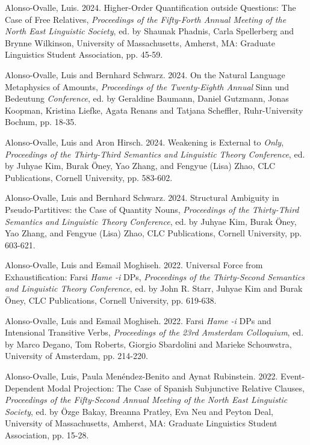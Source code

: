 \documentclass[11pt]{article}
\begin{document}
Alonso-Ovalle, Luis. 2024. Higher-Order Quantification outside Questions: The Case of Free Relatives, \textit{Proceedings of the Fifty-Forth Annual Meeting of the North East Linguistic Society}, ed. by Shaunak Phadnis, Carla Spellerberg and Brynne Wilkinson, University of Massachusetts, Amherst, MA: Graduate Linguistics Student Association, pp. 45-59.

Alonso-Ovalle, Luis and Bernhard Schwarz. 2024. On the Natural Language Metaphysics of Amounts, \textit{Proceedings of the Twenty-Eighth Annual} Sinn und Bedeutung \textit{Conference}, ed. by Geraldine Baumann, Daniel Gutzmann, Jonas Koopman, Kristina Liefke, Agata Renans and Tatjana Scheffler, Ruhr-University Bochum, pp. 18-35.


Alonso-Ovalle, Luis and Aron Hirsch. 2024. Weakening is External to \textit{Only}, \textit{Proceedings of the Thirty-Third Semantics and Linguistic Theory Conference}, ed. by Juhyae Kim, Burak \"{O}ney, Yao Zhang, and Fengyue (Lisa) Zhao, CLC Publications, Cornell University, pp. 583-602.

Alonso-Ovalle, Luis and Bernhard Schwarz. 2024. Structural Ambiguity in Pseudo-Partitives: the Case of Quantity Nouns, \textit{Proceedings of the Thirty-Third Semantics and Linguistic Theory Conference}, ed. by Juhyae Kim, Burak \"{O}ney, Yao Zhang, and Fengyue (Lisa) Zhao, CLC Publications, Cornell University, pp. 603-621. %


Alonso-Ovalle, Luis and Esmail Moghiseh. 2022. Universal Force from Exhaustification: Farsi \textit{Hame -i} DPs, \textit{Proceedings of the Thirty-Second Semantics and Linguistic Theory Conference}, ed. by John R. Starr, Juhyae Kim and Burak \"{O}ney, CLC Publications, Cornell University, pp. 619-638. %


Alonso-Ovalle, Luis and Esmail Moghiseh. 2022. Farsi \textit{Hame -i} DPs and Intensional Transitive Verbs, \textit{Proceedings of the 23rd Amsterdam Colloquium}, ed. by Marco Degano, Tom Roberts, Giorgio Sbardolini and Marieke Schouwstra, University of Amsterdam, pp. 214-220.%

Alonso-Ovalle, Luis, Paula Men\'endez-Benito and Aynat Rubinstein. 2022. Event-Dependent Modal Projection: The Case of Spanish Subjunctive Relative Clauses, \textit{Proceedings of the Fifty-Second Annual Meeting of the North East Linguistic Society}, ed. by \"{O}zge Bakay, Breanna Pratley, Eva Neu and Peyton Deal, University of Massachusetts, Amherst, MA: Graduate Linguistics Student Association, pp. 15-28.
\end{document}
